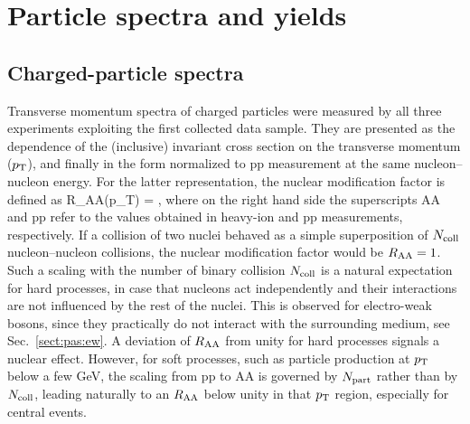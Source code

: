\section{Particle spectra and yields}
\label{secks:spectra}
\subsection{Charged-particle spectra}
\label{subsecks:transspectra}
Transverse momentum spectra of charged particles were measured by all three experiments exploiting the first collected data sample. They are presented as the dependence of the (inclusive) invariant cross section on the transverse momentum ($p_{\rm T}$), and finally in the form normalized to pp measurement at the same nucleon--nucleon energy. For the latter representation, the nuclear modification factor is defined as
\be
R_{\rm AA}(p_{\rm T}) =  ,
\label{eqks:RAA}
\ee
where on the right hand side the superscripts AA and pp refer to the values obtained in heavy-ion and pp measurements, respectively. If a collision of two nuclei behaved as a simple superposition of $N_{\rm coll}$ nucleon--nucleon collisions, the nuclear modification factor would be $R_{\rm AA} = 1$. Such a scaling with the number of binary collision $N_{\rm coll}$ is a natural expectation for hard processes, in case that nucleons act independently and their interactions are not influenced by the rest of the nuclei. This is observed for electro-weak bosons, since they practically do not interact with the surrounding medium, see Sec.~\ref{sect:pas:ew}. A deviation of $R_{\rm AA}$ from unity for hard processes signals a nuclear effect. However, for soft processes, such as particle production at $p_{\rm T}$ below a few GeV, the scaling from pp to AA is governed by $N_{\rm part}$ rather than by $N_{\rm coll}$, leading naturally to an $R_{\rm AA}$ below unity in that $p_{\rm T}$ region, especially for central events.

